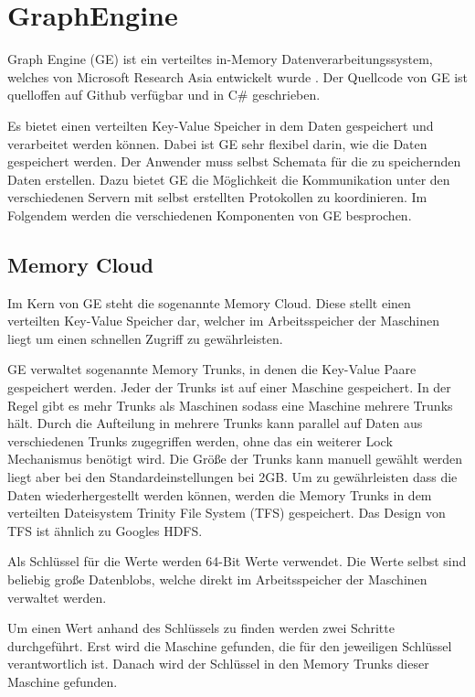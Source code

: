 \section{GraphEngine}

Graph Engine (GE) ist ein verteiltes in-Memory Datenverarbeitungssystem, welches von Microsoft Research Asia 
entwickelt wurde \cite{graphEngine}. Der Quellcode von GE ist quelloffen auf Github verfügbar und in C\# geschrieben.

Es bietet einen verteilten Key-Value Speicher in dem Daten gespeichert und verarbeitet werden können. Dabei ist GE sehr flexibel darin, wie die Daten gespeichert werden. Der Anwender muss selbst
Schemata für die zu speichernden Daten erstellen. Dazu bietet GE die Möglichkeit die Kommunikation unter den verschiedenen Servern mit selbst erstellten Protokollen zu koordinieren. Im Folgendem werden die verschiedenen Komponenten von GE besprochen.

\subsection{Memory Cloud}

Im Kern von GE steht die sogenannte Memory Cloud. Diese stellt einen verteilten Key-Value Speicher dar, welcher im Arbeitsspeicher der Maschinen
liegt um einen schnellen Zugriff zu gewährleisten.

GE verwaltet sogenannte Memory Trunks, in denen die Key-Value Paare gespeichert werden. Jeder der Trunks ist auf einer Maschine gespeichert.
In der Regel gibt es mehr Trunks als Maschinen sodass eine Maschine mehrere Trunks hält. Durch die Aufteilung in mehrere Trunks kann parallel auf Daten aus verschiedenen Trunks zugegriffen
werden, ohne das ein weiterer Lock Mechanismus benötigt wird. Die Größe der Trunks kann manuell gewählt werden liegt aber bei den Standardeinstellungen bei 2GB.
Um zu gewährleisten dass die Daten wiederhergestellt werden können, werden die Memory Trunks in dem verteilten Dateisystem Trinity File System (TFS) gespeichert. Das Design von TFS ist ähnlich zu Googles HDFS.

Als Schlüssel für die Werte werden 64-Bit Werte verwendet.
Die Werte selbst sind beliebig große Datenblobs, welche direkt im Arbeitsspeicher der Maschinen verwaltet werden.


Um einen Wert anhand des Schlüssels zu finden werden zwei Schritte durchgeführt. Erst wird die Maschine gefunden, die für den jeweiligen Schlüssel
verantwortlich ist. Danach wird der Schlüssel in den Memory Trunks dieser Maschine gefunden.


